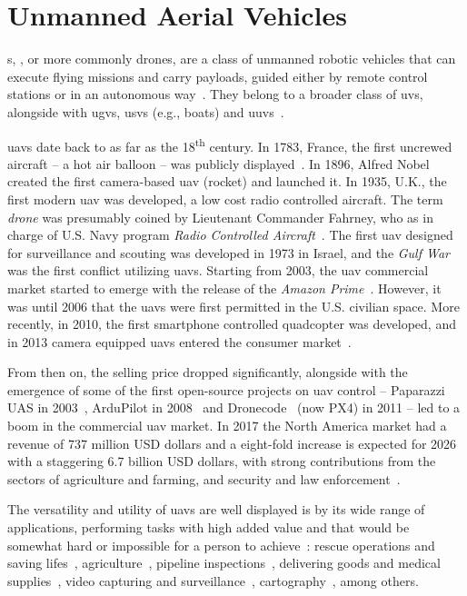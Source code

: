 \section{Unmanned Aerial Vehicles}%
\label{sec:unmann-aeri-vehicl}
s, , or more commonly drones, are a class of
unmanned robotic vehicles that can execute flying missions and carry payloads,
guided either by remote control stations or in an autonomous
way~\cite{alladi2022UAVBlockain,glossner2021overview}.
They belong to a broader class of \glspl{uv}, alongside with \glspl{ugv}, \glspl{usv}
(e.g., boats) and \glspl{uuv}~\cite{glossner2021overview}.

\glspl{uav} date back to as far as the 18\textsuperscript{th} century. In 1783,
France, the first uncrewed aircraft -- a hot air balloon --
was publicly displayed~\cite{uavHistory}. In 1896, Alfred Nobel created the first camera-based \gls{uav}
(rocket) and launched it. In 1935, U.K., the first modern \gls{uav} was
developed, a low cost radio controlled aircraft. The term \emph{drone} was
presumably coined by Lieutenant Commander Fahrney, who as in charge of U.S. Navy
program \emph{Radio Controlled Aircraft}~\cite{uavHistory}. The first \gls{uav} designed for
surveillance and scouting was developed in 1973 in Israel, and the \emph{Gulf
  War} was the first conflict utilizing \glspl{uav}. Starting from 2003,
the \gls{uav} commercial market started to emerge with the release of the
\emph{Amazon Prime}~\cite{alladi2022UAVBlockain}.
However, it was until 2006 that the \glspl{uav} were first
permitted in the U.S. civilian space. More recently, in 2010, the first
smartphone controlled quadcopter was developed, and in 2013 camera equipped
\glspl{uav} entered the consumer market~\cite{uavHistory}.

From then on, the selling price dropped significantly, alongside with the
emergence of some of the first open-source projects on \gls{uav} control --
Paparazzi UAS in 2003~\cite{paparazzi-home}, ArduPilot in
2008~\cite{arduPilotHistory} and Dronecode~\cite{px4History} (now PX4) in 2011
-- led to a boom in the commercial \gls{uav} market. In 2017 the North America
market had a revenue of 737 million USD dollars and a eight-fold increase is
expected for 2026 with a staggering 6.7 billion USD dollars, with strong
contributions from the sectors of agriculture and farming, and security and law enforcement~\cite{mohsan2022towards}.

The versatility and utility of \glspl{uav} are well displayed is by its wide
range of applications, performing tasks with high added value and that would be
somewhat hard or impossible for a person to achieve~\cite{silvagni_multipurpose_2017,lammers_airborne_2023}: rescue operations and
saving lifes~\cite{silvagni_multipurpose_2017}, agriculture~\cite{tsouros_review_2019}, pipeline
inspections~\cite{yu_uav-based_2022}, delivering goods and medical supplies~\cite{lammers_airborne_2023}, video capturing and
surveillance~\cite{dilshad_applications_2020}, cartography~\cite{caroti_uav-borne_2017},
among others.

